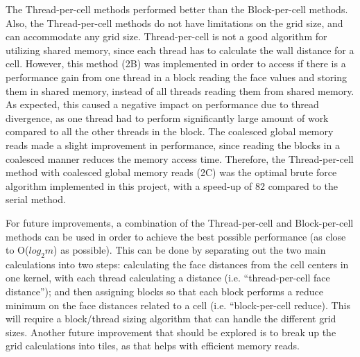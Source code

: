 \documentclass[]{aiaa-tc}%
\begin{document}
The Thread-per-cell methods performed better than the Block-per-cell
methods.  Also, the Thread-per-cell methods do not have limitations on
the grid size, and can accommodate any grid size.  Thread-per-cell is
not a good algorithm for utilizing shared memory, since each thread
has to calculate the wall distance for a cell.  However, this method
(2B) was implemented in order to access if there is a performance gain
from one thread in a block reading the face values and storing them in
shared memory, instead of all threads reading them from shared memory.
As expected, this caused a negative impact on performance due to
thread divergence, as one thread had to perform significantly large
amount of work compared to all the other threads in the block.  The
coalesced global memory reads made a slight improvement in
performance, since reading the blocks in a coalesced manner reduces
the memory access time.  Therefore, the Thread-per-cell method with
coalesced global memory reads (2C) was the optimal brute force
algorithm implemented in this project, with a speed-up of 82 compared
to the serial method.


For future improvements, a combination of the Thread-per-cell and
Block-per-cell methods can be used in order to achieve the best
possible performance (as close to O($log_2 m$) as possible).  This can be
done by separating out the two main calculations into two steps:
calculating the face distances from the cell centers in one kernel,
with each thread calculating a distance (i.e. “thread-per-cell face
distance”); and then assigning blocks so that each block performs a
reduce minimum on the face distances related to a cell
(i.e. “block-per-cell reduce).  This will require a block/thread
sizing algorithm that can handle the different grid sizes.  Another
future improvement that should be explored is to break up the grid
calculations into tiles, as that helps with efficient memory reads. 
\end{document}
